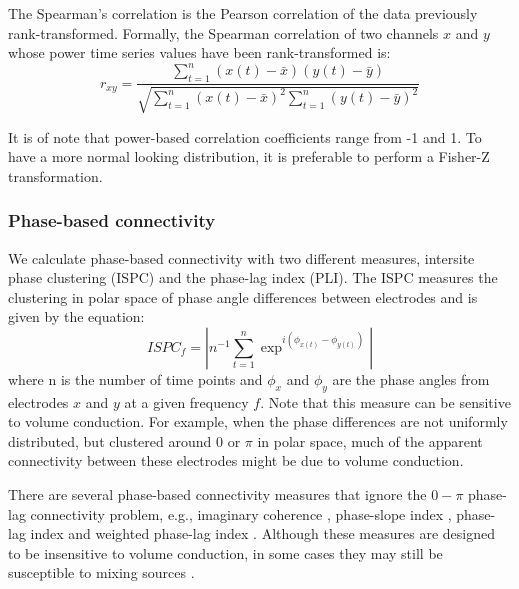 \documentclass[11pt, onecolumn]{article}
\begin{document}
The Spearman's correlation is the Pearson correlation of the data previously rank-transformed. Formally, the Spearman correlation of two channels $x$ and $y$ whose power time series values have been rank-transformed is:
\begin{equation}
r_{xy} = \frac{\sum_{t=1}^{n}(x(t) - \bar{x})(y(t) - \bar{y})}{\sqrt{{\sum_{t=1}^{n}(x(t) - \bar{x})^2}{\sum_{t=1}^{n}(y(t) - \bar{y})^2}}}
\label{eq:pears}
\end{equation}

It is of note that power-based correlation coefficients range from -1 and 1. To have a more normal looking distribution, it is preferable to perform a Fisher-Z transformation.

\subsubsection{Phase-based connectivity}
We calculate phase-based connectivity with two different measures, intersite phase clustering (ISPC) and the phase-lag index (PLI). 
The ISPC measures the clustering in polar space of phase angle differences between electrodes and is given by the equation:
\begin{equation}
ISPC_f = | n^{-1} \sum_{t=1}^{n} \exp ^{i(\phi_{x(t)} -\phi_{y(t)})}|
\label{eq:ispc}
\end{equation}
where n is the number of time points and $\phi_x$ and $\phi_y$ are the phase angles from electrodes $x$ and $y$ at a given frequency $f$. Note that this measure can be sensitive to volume conduction. For example, when the phase differences are not uniformly distributed, but clustered around 0 or $\pi$ in polar space, much of the apparent connectivity between these electrodes might be due to volume conduction.

There are several phase-based connectivity measures that ignore the $0-\pi$ phase-lag connectivity problem, e.g., imaginary coherence \citep{nolte2004identifying}, phase-slope index \citep{nolte2008robustly}, phase-lag index \citep{stam2007phase} and weighted phase-lag index \cite{vinck2011improved}. Although these measures are designed to be insensitive to volume conduction, in
some cases they may still be susceptible to mixing sources \citep{peraza2012volume}.
\end{document}
